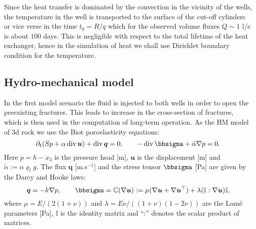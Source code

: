 \documentclass{article}
\newcommand{\CC}{\mathbb C}
\renewcommand{\div}{\operatorname{div}}
\newcommand{\eq}[1]{\begin{equation}#1\end{equation}}
\newcommand{\II}{\mathbb I}
\newcommand{\uu}{\vc u}
\newcommand{\vc}[1]{\boldsymbol{#1}}
\begin{document}
Since the heat transfer is dominated by the convection in the vicinity of the wells, the temperature in the well is transported to the surface of the cut-off cylinders or vice verse in the time $t_0 = R/q$ which for the observed volume fluxes $Q\sim 1$ l/s is about $100$ days. This is negligible with respect to the total lifetime of the heat exchanger, hence in the simulation of heat we shall use Dirichlet boundary condition for the temperature.




\subsection{Hydro-mechanical model}
\label{sc:hm_model}

In the first model scenario the fluid is injected to both wells in order to open the preexisting fractures.
This leads to increase in the cross-section of fractures, which is then used in the computation of long-term operation.
As the HM model of 3d rock we use the Biot poroelasticity equations:
\eq{\label{eq:biot} \partial_t(Sp + \alpha\div\uu) +\div\vc q = 0,\qquad -\div\bbsigma + \tilde\alpha\nabla p = 0. }
Here $p=h-x_3$ is the pressure head [m], $\uu$ is the displacement [m] and $\tilde\alpha:=\alpha\varrho_l g$.
The flux $\vc q$ [m.s${}^{-1}$] and the stress tensor $\bbsigma$ [Pa] are given by the Darcy and Hooke laws:
\eq{ \vc q = - k\nabla p, \qquad \bbsigma = \CC(\nabla\uu) := \mu(\nabla\uu+\nabla\uu^\top) + \lambda(\II:\nabla\uu)\II, }
where $\mu=E/(2(1+\nu))$ and $\lambda=E\nu/((1+\nu)(1-2\nu))$ are the Lamé parameters [Pa], $\II$ is the identity matrix and ``:'' denotes the scalar product of matrices.
\end{document}
